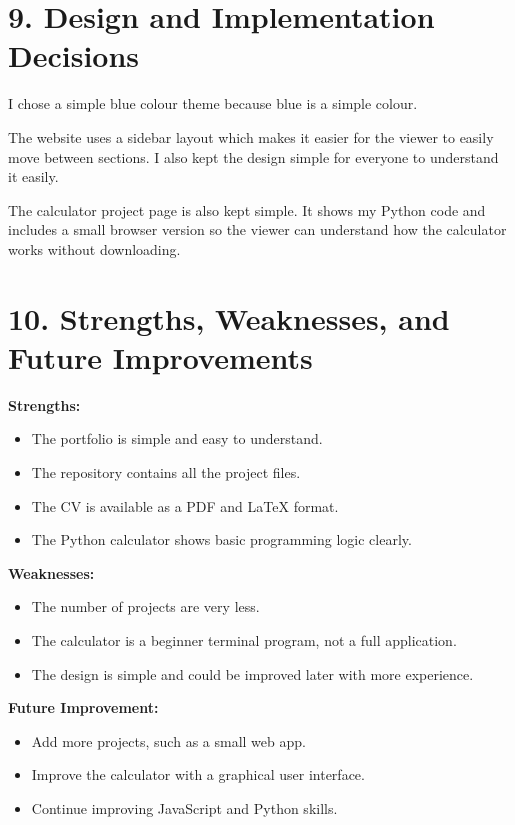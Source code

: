 \documentclass[12pt,a4paper]{article}
\begin{document}
\section{9. Design and Implementation Decisions}

I chose a simple blue colour theme because blue is a simple colour.

The website uses a sidebar layout which makes it easier for the viewer to easily move between sections. I also kept the design simple for everyone to understand it easily.

The calculator project page is also kept simple. It shows my Python code and includes a small browser version so the viewer can understand how the calculator works without downloading.

\section{10. Strengths, Weaknesses, and Future Improvements}

\textbf{Strengths:}

\begin{itemize}[leftmargin=*]
    \item The portfolio is simple and easy to understand.
    \item The repository contains all the project files.
    \item The CV is available as a PDF and LaTeX format.
    \item The Python calculator shows basic programming logic clearly.
\end{itemize}

\textbf{Weaknesses:}

\begin{itemize}[leftmargin=*]
    \item The number of projects are very less.
    \item The calculator is a beginner terminal program, not a full application.
    \item The design is simple and could be improved later with more experience.
\end{itemize}

\textbf{Future Improvement:}

\begin{itemize}[leftmargin=*]
    \item Add more projects, such as a small web app.
    \item Improve the calculator with a graphical user interface.
    \item Continue improving JavaScript and Python skills.
\end{itemize}
\end{document}
